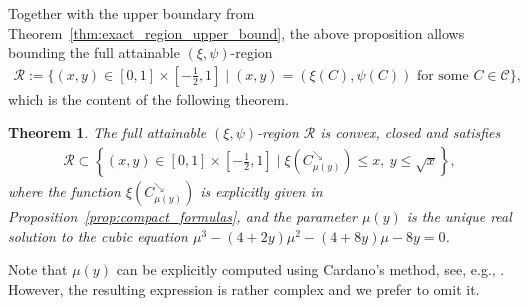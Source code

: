 \documentclass{article}
\newtheorem{theorem}{Theorem}[section]
\newcommand{\1}{\mathds{1}}
\newcommand{\CC}{\mathcal{C}}  %
\begin{document}
Together with the upper boundary from Theorem~\ref{thm:exact_region_upper_bound}, the above proposition allows bounding the full attainable $(\xi,\psi)$-region
\begin{align}\label{eq:attainable_region}
\mathcal{R}:=\{(x,y)\in[0, 1] \times [-\tfrac12, 1] \mid (x,y) = (\xi(C), \psi(C)) \text{ for some } C \in \CC\},
\end{align}
which is the content of the following theorem.

\begin{theorem}
    \label{thm:final_explicit_region}
The full attainable $(\xi,\psi)$-region $\mathcal{R}$ is convex, closed and satisfies
\begin{align}\label{eq:region_bound}
\mathcal{R} \subset \left\{ (x,y) \in [0, 1] \times [-\tfrac12, 1] \mid \xi(C^{\searrow}_{\mu(y)}) \le x,~y \le \sqrt{x} \right\},
\end{align}
where the function $\xi(C^{\searrow}_{\mu(y)})$ is explicitly given in Proposition~\ref{prop:compact_formulas}, and the parameter $\mu(y)$ is the unique real solution to the cubic equation $\mu^3 - (4+2y)\mu^2 - (4+8y)\mu - 8y = 0$.
\end{theorem}

Note that $\mu(y)$ can be explicitly computed using Cardano's method, see, e.g., \cite[Chapter 8.8]{lal2017algebra2}.
However, the resulting expression is rather complex and we prefer to omit it.
\end{document}
